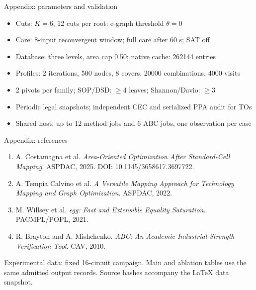 \begin{frame}{Appendix: parameters and validation}
\begin{itemize}\item Cuts: $K=6$, 12 cuts per root; e-graph threshold $\theta=0$\item Care: 8-input reconvergent window; full care after 60 s; SAT off\item Database: three levels, area cap 0.50; native cache: 262144 entries\item Profiles: 2 iterations, 500 nodes, 8 covers, 20000 combinations, 4000 visits\item 2 pivots per family; SOP/DSD: $\ge4$ leaves; Shannon/Davio: $\ge3$\item Periodic legal snapshots; independent CEC and serialized PPA audit for TOs\item Shared host: up to 12 method jobs and 6 ABC jobs, one observation per case\end{itemize}
\end{frame}
\begin{frame}{Appendix: references}
\small
\begin{enumerate}\item[{[1]}] A. Costamagna et al. \textit{Area-Oriented Optimization After Standard-Cell Mapping}. ASPDAC, 2025. DOI: 10.1145/3658617.3697722.
\item[{[2]}] A. Tempia Calvino et al. \textit{A Versatile Mapping Approach for Technology Mapping and Graph Optimization}. ASPDAC, 2022.
\item[{[3]}] M. Willsey et al. \textit{egg: Fast and Extensible Equality Saturation}. PACMPL/POPL, 2021.
\item[{[4]}] R. Brayton and A. Mishchenko. \textit{ABC: An Academic Industrial-Strength Verification Tool}. CAV, 2010.
\end{enumerate}
\vspace{2mm}Experimental data: fixed 16-circuit campaign. Main and ablation tables use the same admitted output records. Source hashes accompany the LaTeX data snapshot.
\end{frame}
